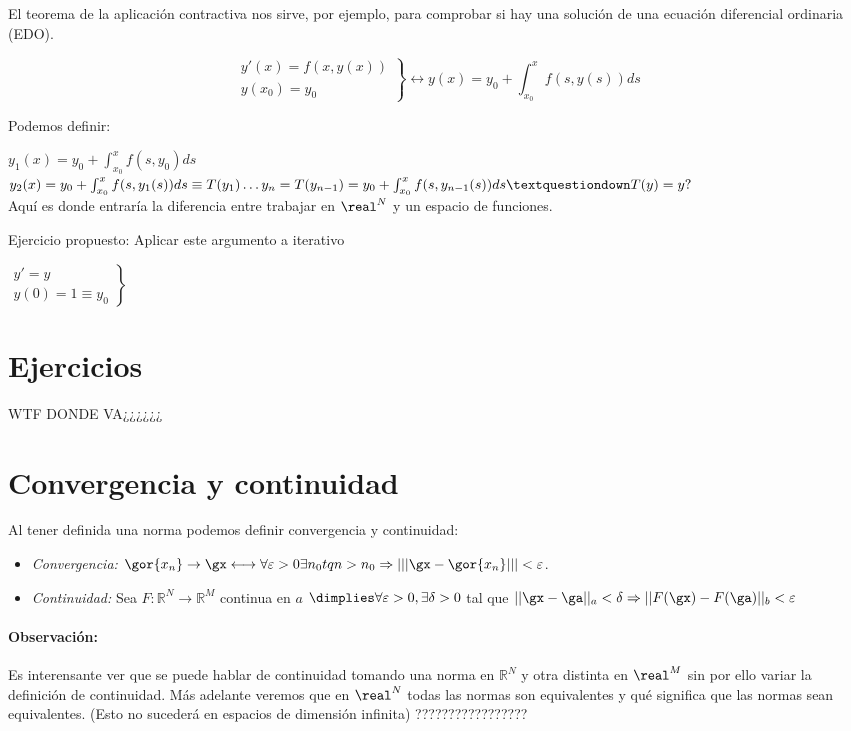 \documentclass{apuntes}
\begin{document}
El teorema de la aplicación contractiva nos sirve, por ejemplo, para comprobar si hay una solución de una ecuación diferencial ordinaria (EDO).

$$\left.\begin{matrix}y'(x) = f(x,y(x))\\
        y(x_0) = y_0
       \end{matrix}\right\} \leftrightarrow y(x) = y_0 + \int_{x_0}^x f(s,y(s)) ds$$

Podemos definir:

$y_1(x) = y_0 + \int_{x_0}^{x} f(s,y_0)ds$\\
$y_2(x) = y_0 + \int_{x_0}^x f(s,y_1(s))ds \equiv T(y_1)\\
\dots\\
y_n = T(y_{n-1}) =  y_0 + \int_{x_0}^x f(s,y_{n-1}(s))ds\\
¿T(y) = y?$\\
Aquí es donde entraría la diferencia entre trabajar en $\real^N$ y un espacio de funciones.

Ejercicio propuesto: Aplicar este argumento a iterativo

$\left. \begin{matrix} y' = y\\
         y(0) = 1 \equiv y_0
        \end{matrix}\right\}$

\newpage
\section{Ejercicios}


\newpage
WTF DONDE VA¿¿¿¿¿¿
\section{Convergencia y continuidad}
Al tener definida una norma podemos definir convergencia y continuidad:
\begin{itemize}
 \item\emph{Convergencia:} $\gor{x_n} \rightarrow \gx \longleftrightarrow \forall \varepsilon > 0 \exists n_0 tq n>n_0 \Rightarrow |||\gx-\gor{x_n}|||<\varepsilon$.
 \item\emph{Continuidad:} Sea $F: \mathbb{R}^N \rightarrow \mathbb{R}^M$ continua en $a$ $\dimplies \forall \varepsilon > 0 , \exists \delta > 0$ tal que $||\gx-\ga||_a < \delta \Rightarrow ||F(\gx)-F(\ga)||_b< \varepsilon$
\end{itemize}
\paragraph{Observación:} Es interensante ver que se puede hablar de continuidad tomando una norma en $\mathbb{R}^N$ y otra distinta en $\real^M$ sin por ello variar la definición de continuidad. Más adelante veremos que en $\real^N$ todas las normas son equivalentes y qué significa que las normas sean equivalentes. (Esto no sucederá en espacios de dimensión infinita)
?????????????????




\newpage
\printindex
\end{document}
